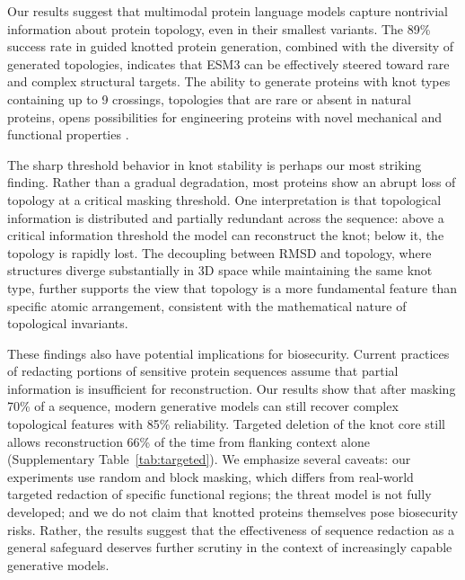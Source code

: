 \documentclass{article}
\begin{document}
Our results suggest that multimodal protein language models capture nontrivial information about protein topology, even in their smallest variants. The 89\% success rate in guided knotted protein generation, combined with the diversity of generated topologies, indicates that ESM3 can be effectively steered toward rare and complex structural targets. The ability to generate proteins with knot types containing up to 9 crossings, topologies that are rare or absent in natural proteins, opens possibilities for engineering proteins with novel mechanical and functional properties \cite{strassler2022tied,sulkowska2012stabilizing}.

The sharp threshold behavior in knot stability is perhaps our most striking finding. Rather than a gradual degradation, most proteins show an abrupt loss of topology at a critical masking threshold. One interpretation is that topological information is distributed and partially redundant across the sequence: above a critical information threshold the model can reconstruct the knot; below it, the topology is rapidly lost. The decoupling between RMSD and topology, where structures diverge substantially in 3D space while maintaining the same knot type, further supports the view that topology is a more fundamental feature than specific atomic arrangement, consistent with the mathematical nature of topological invariants.

These findings also have potential implications for biosecurity. Current practices of redacting portions of sensitive protein sequences assume that partial information is insufficient for reconstruction. Our results show that after masking 70\% of a sequence, modern generative models can still recover complex topological features with 85\% reliability. Targeted deletion of the knot core still allows reconstruction 66\% of the time from flanking context alone (Supplementary Table~\ref{tab:targeted}). We emphasize several caveats: our experiments use random and block masking, which differs from real-world targeted redaction of specific functional regions; the threat model is not fully developed; and we do not claim that knotted proteins themselves pose biosecurity risks. Rather, the results suggest that the effectiveness of sequence redaction as a general safeguard deserves further scrutiny in the context of increasingly capable generative models.
\end{document}
